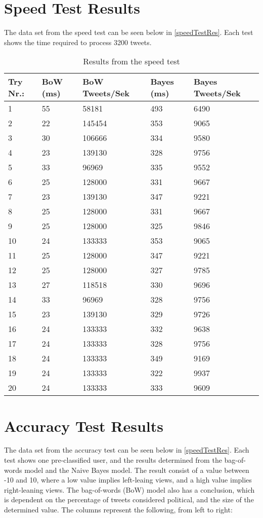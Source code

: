 \chapter{Speed Test Results}\label{app:speedTest}
The data set from the speed test can be seen below in \autoref{speedTestRes}.
Each test shows the time required to process 3200 tweets.

\begin{table}[H]\centering
\begin{tabular}{|l|l|l|l|l|}
\hline
Try Nr.:	&	BoW (ms)	&	BoW Tweets/Sek	&	Bayes (ms)	&	Bayes Tweets/Sek	\\\hline
1	&	55	&	58181	&	493	&	6490 \\\hline
2	&	22	&	145454	&	353	&	9065 \\\hline
3	&	30	&	106666	&	334	&	9580 \\\hline
4	&	23	&	139130	&	328	&	9756 \\\hline
5	&	33	&	96969	&	335	&	9552 \\\hline
6	&	25	&	128000	&	331	&	9667 \\\hline
7	&	23	&	139130	&	347	&	9221 \\\hline
8	&	25	&	128000	&	331	&	9667 \\\hline
9	&	25	&	128000	&	325	&	9846 \\\hline
10	&	24	&	133333	&	353	&	9065 \\\hline
11	&	25	&	128000	&	347	&	9221 \\\hline
12	&	25	&	128000	&	327	&	9785 \\\hline
13	&	27	&	118518	&	330	&	9696 \\\hline
14	&	33	&	96969	&	328	&	9756 \\\hline
15	&	23	&	139130	&	329	&	9726 \\\hline
16	&	24	&	133333	&	332	&	9638 \\\hline
17	&	24	&	133333	&	328	&	9756 \\\hline
18	&	24	&	133333	&	349	&	9169 \\\hline
19	&	24	&	133333	&	322	&	9937 \\\hline
20	&	24	&	133333	&	333	&	9609 \\\hline
\end{tabular}
\caption{Results from the speed test}
\label{speedTestRes}
\end{table}

\chapter{Accuracy Test Results}\label{app:AccuracyTest}
The data set from the accuracy test can be seen below in \autoref{speedTestRes}.
Each test shows one pre-classified user, and the results determined from the
bag-of-words model and the Naive Bayes model. The result consist of a value
between -10 and 10, where a low value implies left-leaing views, and a high
value implies right-leaning views. The bag-of-words (BoW) model also has a
conclusion, which is dependent on the percentage of tweets considered political,
and the size of the determined value. The columns represent the following, from
left to right:\nl

